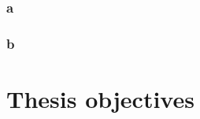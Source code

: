         \subsubsection{a}
        \subsubsection{b}
        
        
        


\section{Thesis objectives}
